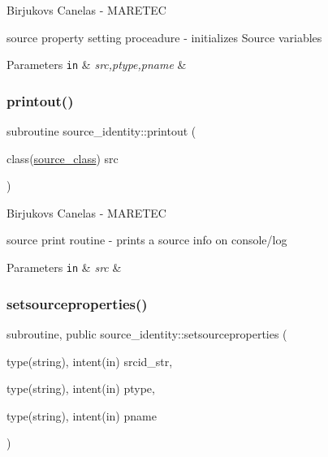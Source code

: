 Birjukovs Canelas -\/ M\+A\+R\+E\+T\+EC 

source property setting proceadure -\/ initializes Source variables 
\begin{DoxyParams}[1]{Parameters}
\mbox{\tt in}  & {\em src,ptype,pname} & \\
\hline
\end{DoxyParams}
\mbox{\label{namespacesource__identity_a9715a7d707b4c80aa2d2ebd08712f6a9}} 
\subsubsection{\texorpdfstring{printout()}{printout()}}
{\footnotesize\ttfamily subroutine source\+\_\+identity\+::printout (\begin{DoxyParamCaption}\item[{class(\hyperlink{structsource__identity_1_1source__class}{source\+\_\+class})}]{src }\end{DoxyParamCaption})\hspace{0.3cm}{\ttfamily [private]}}



Birjukovs Canelas -\/ M\+A\+R\+E\+T\+EC 

source print routine -\/ prints a source info on console/log 
\begin{DoxyParams}[1]{Parameters}
\mbox{\tt in}  & {\em src} & \\
\hline
\end{DoxyParams}
\mbox{\label{namespacesource__identity_a8b07a03d4f79249743896163e9c85f55}} 
\subsubsection{\texorpdfstring{setsourceproperties()}{setsourceproperties()}}
{\footnotesize\ttfamily subroutine, public source\+\_\+identity\+::setsourceproperties (\begin{DoxyParamCaption}\item[{type(string), intent(in)}]{srcid\+\_\+str,  }\item[{type(string), intent(in)}]{ptype,  }\item[{type(string), intent(in)}]{pname }\end{DoxyParamCaption})}



